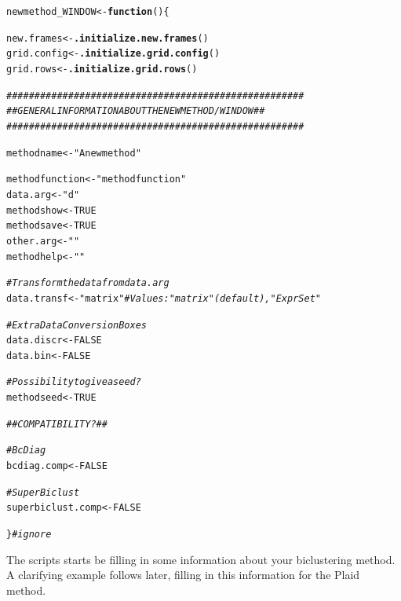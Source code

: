 \documentclass[a4paper]{article}\usepackage[]{graphicx}\usepackage[]{color}
\makeatletter
\newcommand{\hlnum}[1]{\textcolor[rgb]{0.686,0.059,0.569}{#1}}%
\newcommand{\hlstr}[1]{\textcolor[rgb]{0.192,0.494,0.8}{#1}}%
\newcommand{\hlcom}[1]{\textcolor[rgb]{0.678,0.584,0.686}{\textit{#1}}}%
\newcommand{\hlstd}[1]{\textcolor[rgb]{0.345,0.345,0.345}{#1}}%
\newcommand{\hlkwa}[1]{\textcolor[rgb]{0.161,0.373,0.58}{\textbf{#1}}}%
\newcommand{\hlkwb}[1]{\textcolor[rgb]{0.69,0.353,0.396}{#1}}%
\newcommand{\hlkwd}[1]{\textcolor[rgb]{0.737,0.353,0.396}{\textbf{#1}}}%
\newenvironment{kframe}{%
 \def\at@end@of@kframe{}%
 \ifinner\ifhmode%
  \def\at@end@of@kframe{\end{minipage}}%
  \begin{minipage}{\columnwidth}%
 \fi\fi%
 \def\FrameCommand##1{\hskip\@totalleftmargin \hskip-\fboxsep
 \colorbox{shadecolor}{##1}\hskip-\fboxsep
     \hskip-\linewidth \hskip-\@totalleftmargin \hskip\columnwidth}%
 \MakeFramed {\advance\hsize-\width
   \@totalleftmargin\z@ \linewidth\hsize
   \@setminipage}}%
 {\par\unskip\endMakeFramed%
 \at@end@of@kframe}
\newenvironment{knitrout}{}{} %
\makeatother
\begin{document}
\begin{knitrout}
\color{fgcolor}\begin{kframe}
\begin{alltt}
\hlstd{newmethod_WINDOW} \hlkwb{<-} \hlkwa{function}\hlstd{()\{}

        \hlstd{new.frames} \hlkwb{<-} \hlkwd{.initialize.new.frames}\hlstd{()}
        \hlstd{grid.config} \hlkwb{<-} \hlkwd{.initialize.grid.config}\hlstd{()}
        \hlstd{grid.rows} \hlkwb{<-} \hlkwd{.initialize.grid.rows}\hlstd{()}

        \hlcom{#####################################################}
        \hlcom{## GENERAL INFORMATION ABOUT THE NEW METHOD/WINDOW ##}
        \hlcom{#####################################################}

        \hlstd{methodname} \hlkwb{<-} \hlstr{"A new method"}

        \hlstd{methodfunction} \hlkwb{<-} \hlstr{"methodfunction"}
        \hlstd{data.arg} \hlkwb{<-} \hlstr{"d"}
        \hlstd{methodshow} \hlkwb{<-} \hlnum{TRUE}
        \hlstd{methodsave} \hlkwb{<-} \hlnum{TRUE}
        \hlstd{other.arg} \hlkwb{<-} \hlstr{""}
        \hlstd{methodhelp} \hlkwb{<-} \hlstr{""}

        \hlcom{# Transform the data from data.arg}
        \hlstd{data.transf} \hlkwb{<-} \hlstr{"matrix"} \hlcom{# Values: "matrix" (default), "ExprSet"}

        \hlcom{# Extra Data Conversion Boxes}
        \hlstd{data.discr} \hlkwb{<-} \hlnum{FALSE}
        \hlstd{data.bin} \hlkwb{<-} \hlnum{FALSE}

        \hlcom{# Possibility to give a seed ?}
        \hlstd{methodseed} \hlkwb{<-} \hlnum{TRUE}

        \hlcom{## COMPATIBILITY? ##}

        \hlcom{# BcDiag}
        \hlstd{bcdiag.comp} \hlkwb{<-} \hlnum{FALSE}

        \hlcom{# SuperBiclust}
        \hlstd{superbiclust.comp} \hlkwb{<-} \hlnum{FALSE}


\hlstd{\}} \hlcom{# ignore}
\end{alltt}
\end{kframe}
\end{knitrout}
\noindent The scripts starts be filling in some information about your
biclustering method. A clarifying example follows later, filling in this
information for the Plaid method.
\end{document}
